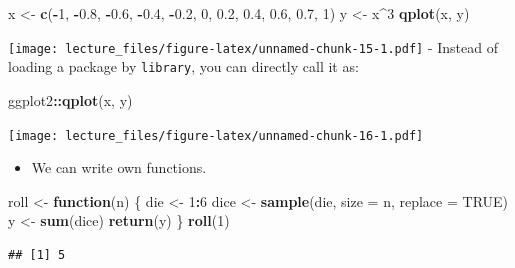 \documentclass[]{book}
\newenvironment{Shaded}{\begin{snugshade}}{\end{snugshade}}
\newcommand{\KeywordTok}[1]{\textcolor[rgb]{0.13,0.29,0.53}{\textbf{#1}}}
\newcommand{\DataTypeTok}[1]{\textcolor[rgb]{0.13,0.29,0.53}{#1}}
\newcommand{\DecValTok}[1]{\textcolor[rgb]{0.00,0.00,0.81}{#1}}
\newcommand{\FloatTok}[1]{\textcolor[rgb]{0.00,0.00,0.81}{#1}}
\newcommand{\StringTok}[1]{\textcolor[rgb]{0.31,0.60,0.02}{#1}}
\newcommand{\OtherTok}[1]{\textcolor[rgb]{0.56,0.35,0.01}{#1}}
\newcommand{\ControlFlowTok}[1]{\textcolor[rgb]{0.13,0.29,0.53}{\textbf{#1}}}
\newcommand{\OperatorTok}[1]{\textcolor[rgb]{0.81,0.36,0.00}{\textbf{#1}}}
\newcommand{\NormalTok}[1]{#1}
\providecommand{\tightlist}{%
  \setlength{\itemsep}{0pt}\setlength{\parskip}{0pt}}
\begin{document}
\begin{Shaded}
\begin{Highlighting}[]
\NormalTok{x <-}\StringTok{ }\KeywordTok{c}\NormalTok{(}\OperatorTok{-}\DecValTok{1}\NormalTok{, }\OperatorTok{-}\FloatTok{0.8}\NormalTok{, }\OperatorTok{-}\FloatTok{0.6}\NormalTok{, }\OperatorTok{-}\FloatTok{0.4}\NormalTok{, }\OperatorTok{-}\FloatTok{0.2}\NormalTok{, }\DecValTok{0}\NormalTok{, }\FloatTok{0.2}\NormalTok{, }\FloatTok{0.4}\NormalTok{, }\FloatTok{0.6}\NormalTok{, }\FloatTok{0.7}\NormalTok{, }\DecValTok{1}\NormalTok{)}
\NormalTok{y <-}\StringTok{ }\NormalTok{x}\OperatorTok{^}\DecValTok{3}
\KeywordTok{qplot}\NormalTok{(x, y)}
\end{Highlighting}
\end{Shaded}

\texttt{[image: lecture\_files/figure-latex/unnamed-chunk-15-1.pdf]} -
Instead of loading a package by \texttt{library}, you can directly call
it as:

\begin{Shaded}
\begin{Highlighting}[]
\NormalTok{ggplot2}\OperatorTok{::}\KeywordTok{qplot}\NormalTok{(x, y)}
\end{Highlighting}
\end{Shaded}

\texttt{[image: lecture\_files/figure-latex/unnamed-chunk-16-1.pdf]}

\begin{itemize}
\tightlist
\item
  We can write own functions.
\end{itemize}

\begin{Shaded}
\begin{Highlighting}[]
\NormalTok{roll <-}\StringTok{ }\ControlFlowTok{function}\NormalTok{(n) \{}
\NormalTok{  die <-}\StringTok{ }\DecValTok{1}\OperatorTok{:}\DecValTok{6}
\NormalTok{  dice <-}\StringTok{ }\KeywordTok{sample}\NormalTok{(die, }\DataTypeTok{size =}\NormalTok{ n, }\DataTypeTok{replace =} \OtherTok{TRUE}\NormalTok{)}
\NormalTok{  y <-}\StringTok{ }\KeywordTok{sum}\NormalTok{(dice)}
  \KeywordTok{return}\NormalTok{(y)}
\NormalTok{\}}
\KeywordTok{roll}\NormalTok{(}\DecValTok{1}\NormalTok{)}
\end{Highlighting}
\end{Shaded}

\begin{verbatim}
## [1] 5
\end{verbatim}
\end{document}
